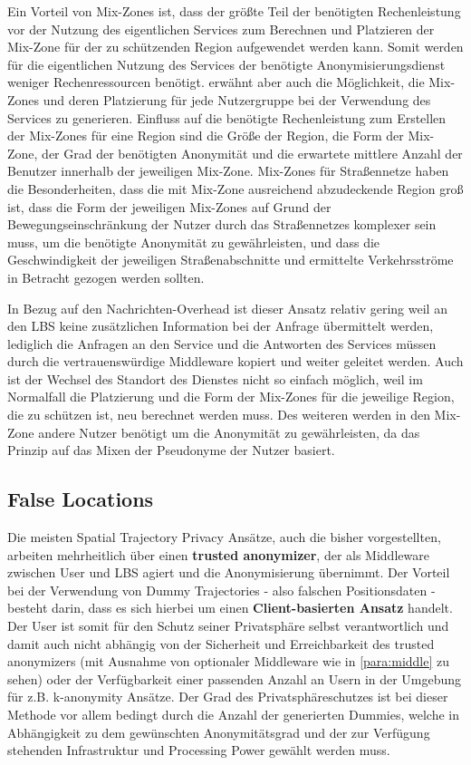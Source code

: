 Ein Vorteil von Mix-Zones ist, dass der größte Teil der benötigten Rechenleistung vor der Nutzung des eigentlichen Services zum Berechnen und Platzieren der Mix-Zone für der zu schützenden Region aufgewendet werden kann. Somit werden für die eigentlichen Nutzung des Services der benötigte Anonymisierungsdienst weniger Rechenressourcen benötigt. \cite{Beresford2003} erwähnt aber auch die Möglichkeit, die Mix-Zones und deren Platzierung für jede Nutzergruppe bei der Verwendung des Services zu generieren. Einfluss auf die benötigte Rechenleistung zum Erstellen der Mix-Zones für eine Region sind die Größe der Region, die Form der Mix-Zone, der Grad der benötigten Anonymität und die erwartete mittlere Anzahl der Benutzer innerhalb der jeweiligen Mix-Zone. Mix-Zones für Straßennetze haben die Besonderheiten, dass die mit Mix-Zone ausreichend abzudeckende Region groß ist, dass die Form der jeweiligen Mix-Zones auf Grund der Bewegungseinschränkung der Nutzer durch das Straßennetzes komplexer sein muss, um die benötigte Anonymität zu gewährleisten, und dass die Geschwindigkeit der jeweiligen Straßenabschnitte und ermittelte Verkehrsströme in Betracht gezogen werden sollten. 

In Bezug auf den Nachrichten-Overhead ist dieser Ansatz relativ gering weil an den LBS keine zusätzlichen Information bei der Anfrage übermittelt werden, lediglich die Anfragen an den Service und die Antworten des Services müssen durch die vertrauenswürdige Middleware kopiert und weiter geleitet werden. Auch ist der Wechsel des Standort des Dienstes nicht so einfach möglich, weil im Normalfall die Platzierung und die Form der Mix-Zones für die jeweilige Region, die zu schützen ist, neu berechnet werden muss. Des weiteren werden in den Mix-Zone andere Nutzer benötigt um die Anonymität zu gewährleisten, da das Prinzip auf das Mixen der Pseudonyme der Nutzer basiert. 

\subsection{False Locations}
Die meisten Spatial Trajectory Privacy Ansätze, auch die bisher vorgestellten, arbeiten mehrheitlich über einen \textbf{trusted anonymizer}, der als Middleware zwischen User und LBS agiert und die Anonymisierung übernimmt. Der Vorteil bei der Verwendung von Dummy Trajectories - also falschen Positionsdaten - besteht darin, dass es sich hierbei um einen \textbf{Client-basierten Ansatz} handelt. Der User ist somit für den Schutz seiner Privatsphäre selbst verantwortlich und damit auch nicht abhängig von der Sicherheit und Erreichbarkeit des trusted anonymizers (mit Ausnahme von optionaler Middleware wie in \ref{para:middle} zu sehen) oder der Verfügbarkeit einer passenden Anzahl an Usern in der Umgebung für z.B. k-anonymity Ansätze. Der Grad des Privatsphäreschutzes ist bei dieser Methode vor allem bedingt durch die Anzahl der generierten Dummies, welche in Abhängigkeit zu dem gewünschten Anonymitätsgrad und der zur Verfügung stehenden Infrastruktur und Processing Power gewählt werden muss.

